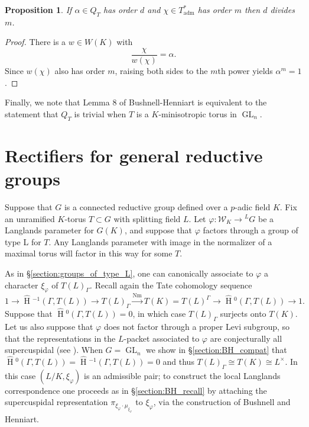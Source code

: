 \documentclass{compositio}
\theoremstyle{plain}
\newtheorem{proposition}[theorem]{Proposition}
\newcommand{\HT}[1]{\hat{\HH}{}^{#1}}
\theoremstyle{definition}
\DeclareMathOperator{\HH}{H}
\DeclareMathOperator{\Nm}{Nm}
\DeclareMathOperator{\GL}{GL}
\newcommand{\Lx}{L^\times}
\newcommand{\Weil}{\mathcal{W}}
\newcommand{\Thadm}{T^*_{\operatorname{adm}}}
\begin{document}
\begin{proposition} \label{orderdiv}
If $\alpha \in Q_T$ has order $d$ and $\chi \in \Thadm$ has order $m$ then $d$ divides $m$.
\end{proposition}
\begin{proof}
There is a $w \in W(K)$ with
$$\frac{\chi}{w(\chi)} = \alpha.$$
Since $w(\chi)$ also has order $m$, raising both sides to the $m$th power  yields $\alpha^m = 1$.
\end{proof}

Finally, we note that Lemma 8 of Bushnell-Henniart \cite[p. 511]{bushnell-henniart:10a} is equivalent to
the statement that $Q_T$ is trivial when $T$ is a $K$-minisotropic torus in $\GL_n$.

\section{Rectifiers for general reductive groups} \label{section:general_rectifiers}

Suppose that $G$ is a connected reductive group defined over a
$p$-adic field $K$.  Fix an unramified $K$-torus $T \subset G$ with splitting field $L$.
Let $\varphi : \Weil_K \rightarrow {}^L G$ be a
Langlands parameter for $G(K)$, and suppose that $\varphi$ factors
through a group of type L for $T$.  Any Langlands parameter with image in the normalizer
of a maximal torus will factor in this way for some $T$.

As in \S\ref{section:groups_of_type_L}, one can canonically
associate to $\varphi$ a character $\xi_{\varphi}$ of $T(L)_{\Gamma}$.
Recall again the Tate cohomology sequence
$$1 \rightarrow \HT{-1}(\Gamma,T(L)) \rightarrow T(L)_{\Gamma} \xrightarrow{\Nm} T(K)
= T(L)^{\Gamma} \rightarrow \HT{0}(\Gamma,T(L)) \rightarrow 1.$$
Suppose that $\HT{0}(\Gamma, T(L)) = 0$, in which case
$T(L)_{\Gamma}$ surjects onto $T(K)$.  Let us also suppose that
$\varphi$ does not factor through a proper Levi subgroup, so that the
representations in the $L$-packet associated to $\varphi$ are
conjecturally all supercuspidal (see \cite[\S 3.5]{reeder-debacker:09a}).
When $G = \GL_n$ we show in \S\ref{section:BH_compat} that
$\HT{0}(\Gamma, T(L)) = \HT{-1}(\Gamma, T(L)) = 0$ and thus
$T(L)_{\Gamma} \cong T(K) \cong \Lx$.  In this case
$(L/K, \xi_{\varphi})$ is an admissible pair; to construct the local Langlands
correspondence one proceeds as in \S\ref{section:BH_recall} by
attaching the supercuspidal representation $\pi_{\xi_{\varphi} \cdot
  \mu_{\xi_{\varphi}}}$ to $\xi_{\varphi}$, via the construction of Bushnell and Henniart.
\end{document}
